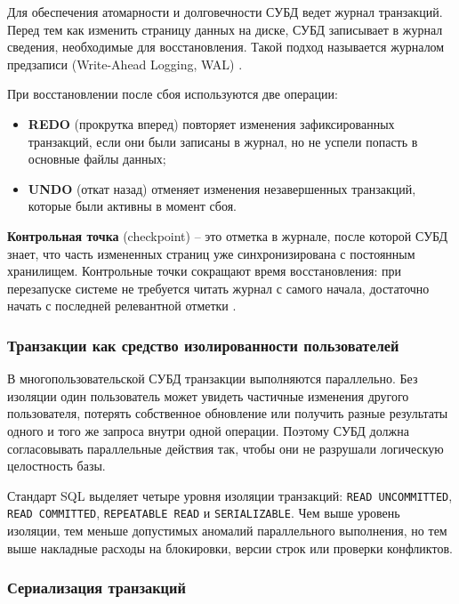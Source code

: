 Для обеспечения атомарности и долговечности СУБД ведет журнал транзакций. Перед тем как изменить страницу данных на диске, СУБД записывает в журнал сведения, необходимые для восстановления. Такой подход называется журналом предзаписи (Write-Ahead Logging, WAL) \autocite{PostgreSQLdocc28}.

При восстановлении после сбоя используются две операции:
\begin{itemize}
    \item \textbf{REDO} (прокрутка вперед) повторяет изменения зафиксированных транзакций, если они были записаны в журнал, но не успели попасть в основные файлы данных;
    \item \textbf{UNDO} (откат назад) отменяет изменения незавершенных транзакций, которые были активны в момент сбоя.
\end{itemize}

\textbf{Контрольная точка} (checkpoint) -- это отметка в журнале, после которой СУБД знает, что часть измененных страниц уже синхронизирована с постоянным хранилищем. Контрольные точки сокращают время восстановления: при перезапуске системе не требуется читать журнал с самого начала, достаточно начать с последней релевантной отметки \autocites{ElmasriNavathe}{MicrosoftLearnSQLserverTransLog}.

\subsubsection{Транзакции как средство изолированности пользователей}

В многопользовательской СУБД транзакции выполняются параллельно. Без изоляции один пользователь может увидеть частичные изменения другого пользователя, потерять собственное обновление или получить разные результаты одного и того же запроса внутри одной операции. Поэтому СУБД должна согласовывать параллельные действия так, чтобы они не разрушали логическую целостность базы.

Стандарт SQL выделяет четыре уровня изоляции транзакций: \texttt{READ UNCOMMITTED}, \texttt{READ COMMITTED}, \texttt{REPEATABLE READ} и \texttt{SERIALIZABLE}. Чем выше уровень изоляции, тем меньше допустимых аномалий параллельного выполнения, но тем выше накладные расходы на блокировки, версии строк или проверки конфликтов.

\subsubsection{Сериализация транзакций}

